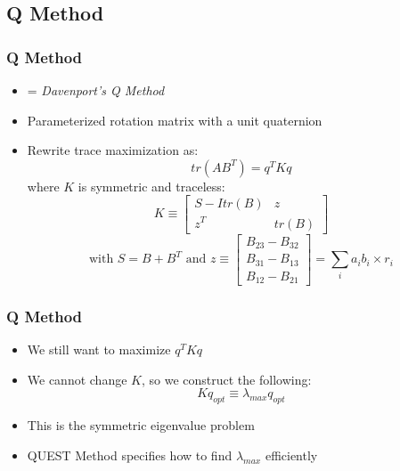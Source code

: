 \documentclass[11pt]{beamer}
\begin{document}
    \subsection{Q Method}\label{subsec:qMethod}
    \begin{frame}
        \frametitle{Q Method}
        \begin{itemize}[<+->]
            \item = \textit{Davenport's Q Method} \medskip
            \item Parameterized rotation matrix with a unit quaternion \medskip
            \item Rewrite trace maximization as:
            \begin{equation}
                \mathit{tr}\left(AB^T \right) = q^T K q
            \end{equation}
            where $K$ is symmetric and traceless:
            \begin{equation*}
                K \equiv
                \begin{bmatrix}
                    S - I \mathit{tr}\left(B\right) & z \\
                    z^T & \mathit{tr}\left(B\right)
                \end{bmatrix}
            \end{equation*}
            \begin{equation*}
                \text{with } S = B + B^T \text{ and } z \equiv
                \begin{bmatrix}
                    B_{23} - B_{32} \\
                    B_{31} - B_{13} \\
                    B_{12} - B_{21}
                \end{bmatrix}
                =
                \sum_i a_i b_i \times r_i
            \end{equation*}
        \end{itemize}
    \end{frame}

    \begin{frame}
        \frametitle{Q Method}
        \begin{itemize}[<+->]
            \item We still want to maximize $q^T K q$ \medskip
            \item We cannot change $K$, so we construct the following:
            \begin{equation}
                K q_{opt} \equiv \lambda_{max} q_{opt}
            \end{equation}
            \item This is the symmetric eigenvalue problem \medskip
            \item QUEST Method specifies how to find $\lambda_{max}$ efficiently
        \end{itemize}
    \end{frame}
\end{document}
